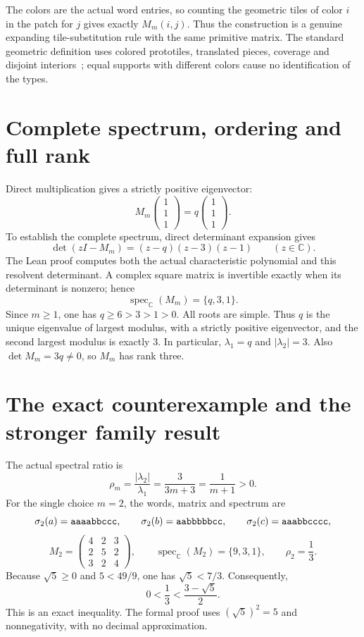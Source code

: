 \documentclass[11pt,a4paper]{article}
\newcommand{\C}{\mathbb C}
\newcommand{\spec}{\operatorname{spec}}
\begin{document}
The colors are the actual word entries, so counting the geometric tiles of color $i$ in the patch for $j$ gives exactly $M_m(i,j)$. Thus the construction is a genuine expanding tile-substitution rule with the same primitive matrix. The standard geometric definition uses colored prototiles, translated pieces, coverage and disjoint interiors~\cite{solomyak}; equal supports with different colors cause no identification of the types.

\section{Complete spectrum, ordering and full rank}
Direct multiplication gives a strictly positive eigenvector:
\[
M_m\!\begin{pmatrix}1\\1\\1\end{pmatrix}
=q\!\begin{pmatrix}1\\1\\1\end{pmatrix}.
\]
To establish the complete spectrum, direct determinant expansion gives
\begin{equation}\label{eq:charpoly}
\det(zI-M_m)=(z-q)(z-3)(z-1)\qquad(z\in\C).
\end{equation}
The Lean proof computes both the actual characteristic polynomial and this resolvent determinant. A complex square matrix is invertible exactly when its determinant is nonzero; hence
\[
\spec_{\C}(M_m)=\{q,3,1\}.
\]
Since $m\ge1$, one has $q\ge6>3>1>0$. All roots are simple. Thus $q$ is the unique eigenvalue of largest modulus, with a strictly positive eigenvector, and the second largest modulus is exactly $3$. In particular, $\lambda_1=q$ and $|\lambda_2|=3$. Also $\det M_m=3q\ne0$, so $M_m$ has rank three.

\newpage
\section{The exact counterexample and the stronger family result}
The actual spectral ratio is
\begin{equation}\label{eq:ratio}
\rho_m=\frac{|\lambda_2|}{\lambda_1}
=\frac3{3m+3}=\frac1{m+1}>0.
\end{equation}
For the single choice $m=2$, the words, matrix and spectrum are
\[
\sigma_2(a)=\text{\texttt{aaaabbccc}},\qquad
\sigma_2(b)=\text{\texttt{aabbbbbcc}},\qquad
\sigma_2(c)=\text{\texttt{aaabbcccc}},
\]
\[
M_2=\begin{pmatrix}4&2&3\\2&5&2\\3&2&4\end{pmatrix},
\qquad \spec_{\C}(M_2)=\{9,3,1\},\qquad \rho_2=\frac13.
\]
Because $\sqrt5\ge0$ and $5<49/9$, one has $\sqrt5<7/3$. Consequently,
\begin{equation}\label{eq:strict}
\boxed{\quad 0<\frac13<\frac{3-\sqrt5}{2}.\quad}
\end{equation}
This is an exact inequality. The formal proof uses $(\sqrt5)^2=5$ and nonnegativity, with no decimal approximation.
\end{document}
